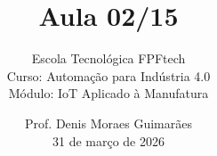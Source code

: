 \title{Aula 02/15}

\subtitle{
\vspace{1.0cm}
Escola Tecnológica FPFtech\\
\vspace{0.5cm}
Curso: Automação para Indústria 4.0\\
\vspace{0.5cm}
Módulo: IoT Aplicado à Manufatura
\vspace{1.0cm}
}

\author{
Prof. Denis Moraes Guimarães\\
\small 31 de março de 2026
}

\date{}